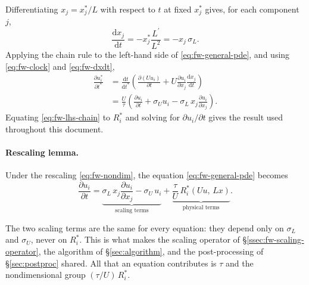 Differentiating $x_j = x_j^*/L$ with respect to $t$ at fixed $x_j^*$ gives,
for each component $j$,
\begin{equation}\label{eq:fw-dxdt}
  \frac{\mathrm{d} x_j}{\mathrm{d} t} = -x_j^* \frac{L^\prime}{L^2} = -x_j\, \sigma_L .
\end{equation}
Applying the chain rule to the left-hand side of \eqref{eq:fw-general-pde},
and using \eqref{eq:fw-clock} and \eqref{eq:fw-dxdt},
\begin{equation}\label{eq:fw-lhs-chain}
  \begin{aligned}
  \frac{\partial u_i^*}{\partial t^*}
  &= \frac{\mathrm{d} t}{\mathrm{d} t^*}\left(
      \frac{\partial (U u_i)}{\partial t}
      + U \frac{\partial u_i}{\partial x_j} \frac{\mathrm{d} x_j}{\mathrm{d} t}
    \right) \\
  &= \frac{U}{\tau}\left(
      \frac{\partial u_i}{\partial t}
      + \sigma_U u_i
      - \sigma_L\, x_j \frac{\partial u_i}{\partial x_j}
    \right).
  \end{aligned}
\end{equation}
Equating \eqref{eq:fw-lhs-chain} to $R_i^*$ and solving for
$\partial u_i / \partial t$ gives the result used throughout this document.

\paragraph{Rescaling lemma.}
Under the rescaling \eqref{eq:fw-nondim}, the equation
\eqref{eq:fw-general-pde} becomes
\begin{equation}\label{eq:fw-lemma}
  \frac{\partial u_i}{\partial t}
  = \underbrace{\sigma_L\, x_j \frac{\partial u_i}{\partial x_j}
    - \sigma_U\, u_i}_{\text{scaling terms}}
  + \underbrace{\frac{\tau}{U}\, R_i^*(U u,\, L x)}_{\text{physical terms}} .
\end{equation}

The two scaling terms are the same for every equation: they depend only on
$\sigma_L$ and $\sigma_U$, never on $R_i^*$. This is what makes the scaling
operator of \S\ref{ssec:fw-scaling-operator}, the algorithm of
\S\ref{sec:algorithm}, and the post-processing of \S\ref{sec:postproc} shared.
All that an equation contributes is $\tau$ and the nondimensional group
$(\tau/U)\,R_i^*$.

